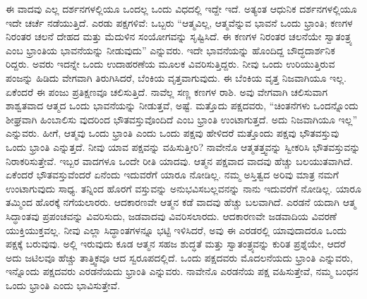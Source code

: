 ಈ ವಾದವು ಎಲ್ಲ ದರ್ಶನಗಳಲ್ಲಿಯೂ ಒಂದಲ್ಲ ಒಂದು ವಿಧದಲ್ಲಿ ಇದ್ದೇ ಇದೆ. ಅತ್ಯಂತ ಆಧುನಿಕ ದರ್ಶನಗಳಲ್ಲಿಯೂ ಇದೇ ಚರ್ಚೆ ನಡೆಯುತ್ತಿದೆ. ಎರಡು ಪಕ್ಷಗಳಿವೆ: ಒಬ್ಬರು “ಆತ್ಮವಿಲ್ಲ, ಆತ್ಮವೆನ್ನುವ ಭಾವನೆ ಒಂದು ಭ್ರಾಂತಿ; ಕಣಗಳ ನಿರಂತರ ಚಲನೆ ದೇಹದ ಮತ್ತು ಮೆದುಳಿನ ಸಂಯೋಗವನ್ನು ಸೃಷ್ಟಿಸಿದೆ. ಈ ಕಣಗಳ ನಿರಂತರ ಚಲನೆಯೇ ಸ್ವಾತಂತ್ರ್ಯ ಎಂಬ ಭ್ರಾಂತಿಯ ಭಾವನೆಯನ್ನು ನೀಡುವುದು” ಎನ್ನುವರು. ಇದೇ ಭಾವನೆಯನ್ನು ಹೊಂದಿದ್ದ ಬೌದ್ಧದಾರ್ಶನಿಕ ರಿದ್ದರು. ಅವರು ಇದನ್ನೇ ಒಂದು ಉದಾಹರಣೆಯ ಮೂಲಕ ವಿವರಿಸುತ್ತಿದ್ದರು. ನೀವು ಒಂದು ಉರಿಯುತ್ತಿರುವ ಪಂಜನ್ನು ಹಿಡಿದು ವೇಗವಾಗಿ ತಿರುಗಿಸಿದರೆ, ಬೆಂಕಿಯ ವೃತ್ತವಾಗುವುದು. ಈ ಬೆಂಕಿಯ ವೃತ್ತ ನಿಜವಾಗಿಯೂ ಇಲ್ಲ. ಏಕೆಂದರೆ ಈ ಪಂಜು ಪ್ರತಿಕ್ಷಣವೂ ಚಲಿಸುತ್ತಿದೆ. ನಾವೆಲ್ಲ ಸಣ್ಣ ಕಣಗಳ ರಾಶಿ. ಅವು ವೇಗವಾಗಿ ಚಲಿಸುವಾಗ ಶಾಶ್ವತವಾದ ಆತ್ಮದ ಒಂದು ಭಾವನೆಯನ್ನು ನೀಡುತ್ತವೆ, ಅಷ್ಟೆ. ಮತ್ತೊದು ಪಕ್ಷದವರು, “ಚಿಂತನೆಗಳು ಒಂದನ್ನೊಂದು ಶೀಘ್ರವಾಗಿ ಹಿಂಬಾಲಿಸು ವುದರಿಂದ ಭೌತವಸ್ತುವೊಂದಿದೆ ಎಂಬ ಭ್ರಾಂತಿ ಉಂಟಾಗುತ್ತದೆ. ಅದು ನಿಜವಾಗಿಯೂ ಇಲ್ಲ” ಎನ್ನುವರು. ಹೀಗೆ, ಆತ್ಮವು ಒಂದು ಭ್ರಾಂತಿ ಎಂದು ಒಂದು ಪಕ್ಷವು ಹೇಳಿದರೆ ಮತ್ತೊಂದು ಪಕ್ಷವು ಭೌತವಸ್ತುವು ಒಂದು ಭ್ರಾಂತಿ ಎನ್ನುತ್ತದೆ. ನೀವು ಯಾವ ಪಕ್ಷವನ್ನು ವಹಿಸುತ್ತೀರಿ? ನಾವೇನೊ ಆತ್ಮತತ್ತ್ವವನ್ನು ಸ್ವೀಕರಿಸಿ ಭೌತವಸ್ತುವನ್ನು ನಿರಾಕರಿಸುತ್ತೇವೆ. ಇಬ್ಬರ ವಾದಗಳೂ ಒಂದೇ ರೀತಿ ಯಾದವು. ಆತ್ಮನ ಪಕ್ಷವಾದ ವಾದವು ಹೆಚ್ಚು ಬಲಯುತವಾಗಿದೆ. ಏಕೆಂದರೆ ಭೌತವಸ್ತುವೆಂದರೆ ಏನೆಂದು ಇದುವರೆಗೆ ಯಾರೂ ನೋಡಿಲ್ಲ. ನಮ್ಮ ಅಸ್ತಿತ್ವದ ಅರಿವು ಮಾತ್ರ ನಮಗೆ ಉಂಟಾಗುವುದು ಸಾಧ್ಯ. ತನ್ನಿಂದ ಹೊರಗೆ ವಸ್ತುವನ್ನು ಅನುಭವಿಸಬಲ್ಲವನನ್ನು ನಾನು ಇದುವರೆಗೆ ನೋಡಿಲ್ಲ. ಯಾರೂ ತಮ್ಮಿಂದ ಹೊರಕ್ಕೆ ನಗೆಯಲಾರರು. ಆದಕಾರಣವೇ ಆತ್ಮನ ಕಡೆ ವಾದವು ಹೆಚ್ಚು ಬಲವಾಗಿದೆ. ಎರಡನೆ ಯದಾಗಿ ಆತ್ಮ ಸಿದ್ಧಾಂತವು ಪ್ರಪಂಚವನ್ನು ವಿವರಿಸುದು, ಜಡವಾದವು ವಿವರಿಸಲಾರದು. ಆದಕಾರಣವೇ ಜಡವಾದಿಯ ವಿವರಣೆ ಯುಕ್ತಿಯುಕ್ತವಲ್ಲ. ನೀವು ಎಲ್ಲಾ ಸಿದ್ಧಾಂತಗಳನ್ನೂ ಭಟ್ಟಿ ಇಳಿಸಿದರೆ, ಅವು ಈ ಎರಡರಲ್ಲಿ ಯಾವುದಾದರೂ ಒಂದು ಪಕ್ಷಕ್ಕೆ ಬರುವುವು. ಅಲ್ಲಿ ಇರುವುದು ಕೂಡ ಆತ್ಮನ ಸಹಜ ಶುದ್ಧತೆ ಮತ್ತು ಸ್ವಾತಂತ್ರ್ಯವನ್ನು ಕುರಿತ ಪ್ರಶ್ನೆಯೇ, ಆದರೆ ಅದು ಜಟಿಲವೂ ಹೆಚ್ಚು ತಾತ್ತ್ವಿಕವೂ ಆದ ಸ್ವರೂಪದಲ್ಲಿದೆ. ಒಂದು ಪಕ್ಷದವರು ಮೊದಲನೆಯದು ಭ್ರಾಂತಿ ಎನ್ನುವರು, ಇನ್ನೊಂದು ಪಕ್ಷದವರು ಎರಡನೆಯದು ಭ್ರಾಂತಿ ಎನ್ನುವರು. ನಾವೇನೊ ಎರಡನೆಯ ಪಕ್ಷ ವಹಿಸುತ್ತೇವೆ, ನಮ್ಮ ಬಂಧನ ಒಂದು ಭ್ರಾಂತಿ ಎಂದು ಭಾವಿಸುತ್ತೇವೆ.

